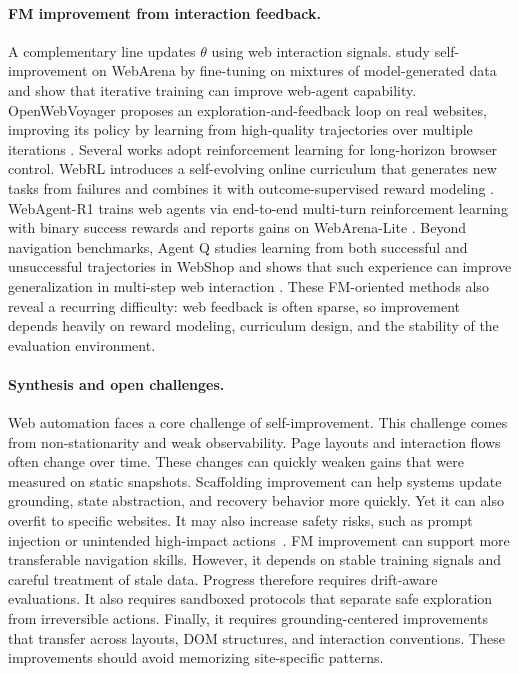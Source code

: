 \documentclass{article}
\begin{document}
\paragraph{FM improvement from interaction feedback.}
A complementary line updates $\theta$ using web interaction signals. \cite{patel2024largelanguagemodelsselfimprove} study self-improvement on WebArena by fine-tuning on mixtures of model-generated data and show that iterative training can improve web-agent capability. OpenWebVoyager proposes an exploration-and-feedback loop on real websites, improving its policy by learning from high-quality trajectories over multiple iterations \citep{he2024openwebvoyagerbuildingmultimodalweb}. Several works adopt reinforcement learning for long-horizon browser control. WebRL introduces a self-evolving online curriculum that generates new tasks from failures and combines it with outcome-supervised reward modeling \citep{qi2025webrl}. WebAgent-R1 trains web agents via end-to-end multi-turn reinforcement learning with binary success rewards and reports gains on WebArena-Lite \citep{wei2025webagentr1trainingwebagents}. Beyond navigation benchmarks, Agent Q studies learning from both successful and unsuccessful trajectories in WebShop and shows that such experience can improve generalization in multi-step web interaction \citep{putta2024agentqadvancedreasoning}. These FM-oriented methods also reveal a recurring difficulty: web feedback is often sparse, so improvement depends heavily on reward modeling, curriculum design, and the stability of the evaluation environment.

\paragraph{Synthesis and open challenges.}
Web automation faces a core challenge of self-improvement. This challenge comes from non-stationarity and weak observability. Page layouts and interaction flows often change over time. These changes can quickly weaken gains that were measured on static snapshots. Scaffolding improvement can help systems update grounding, state abstraction, and recovery behavior more quickly. Yet it can also overfit to specific websites. It may also increase safety risks, such as prompt injection or unintended high-impact actions~\citep{chen2026much}. FM improvement can support more transferable navigation skills. However, it depends on stable training signals and careful treatment of stale data. Progress therefore requires drift-aware evaluations. It also requires sandboxed protocols that separate safe exploration from irreversible actions. Finally, it requires grounding-centered improvements that transfer across layouts, DOM structures, and interaction conventions. These improvements should avoid memorizing site-specific patterns.
\end{document}
